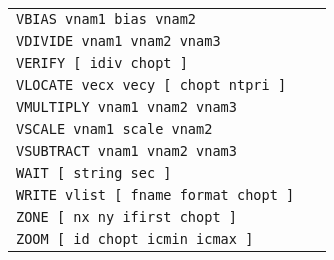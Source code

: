\begin{longtable}{|>{\tt}ll|}
VBIAS vnam1 bias vnam2 & \pageref{VECTORVBIAS}\\ 
VDIVIDE vnam1 vnam2 vnam3 & \pageref{VECTORVDIVIDE}\\ 
VERIFY [ idiv chopt ]  & \pageref{ZEBRAVERIFY}\\ 
VLOCATE vecx vecy [ chopt ntpri ]  & \pageref{GRAPHICSVLOCATE}\\ 
VMULTIPLY vnam1 vnam2 vnam3 & \pageref{VECTORVMULTIPLY}\\ 
VSCALE vnam1 scale vnam2 & \pageref{VECTORVSCALE}\\ 
VSUBTRACT vnam1 vnam2 vnam3 & \pageref{VECTORVSUBTRACT}\\ 
WAIT [ string sec ]  & \pageref{KUIPWAIT}\\ 
WRITE vlist [ fname format chopt ]  & \pageref{VECTORWRITE}\\ 
ZONE [ nx ny ifirst chopt ]  & \pageref{GRAPHICSZONE}\\ 
ZOOM [ id chopt icmin icmax ]  & \pageref{HISTOGRAMZOOM}\\ 
\end{longtable}

\newpage

